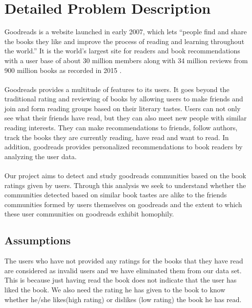 \documentclass[11pt]{article}
\begin{document}
\maketitle

\section{Detailed Problem Description}
Goodreads is a website launched in early 2007, which lets ``people find and share the books they like and improve the process of reading and learning throughout the world.'' It is the world's largest site for readers and book recommendations with a user base of about 30 million members along with 34 million reviews from 900 million books as recorded in 2015 \cite{goodreads:aboutus}.\\\\
Goodreads provides a multitude of features to its users. It goes beyond the traditional rating and reviewing of books by allowing users to make friends and join and form reading groups based on their literary tastes.
Users can not only see what their friends have read, but they can also meet new people with similar reading interests. They can make recommendations to friends, follow authors, track the books they are currently reading, have read and want to read. In addition, goodreads provides personalized recommendations to book readers by analyzing the user data.\\\\
Our project aims  to detect and study goodreads communities based on the book ratings given by users. Through this analysis we seek to understand whether the communities detected based on similar book tastes are alike to the friends communities formed by users themselves on goodreads and the extent to which these user communities on goodreads exhibit homophily.
\subsection{Assumptions}
The users who have not provided any ratings for the books that they have read are considered as invalid users and we have eliminated them from our data set. This is because just having read the book does not indicate that the user has liked the book. We also need the rating he has given to the book to know whether he/she likes(high rating) or dislikes (low rating) the book he has read.\\\\
\end{document}
